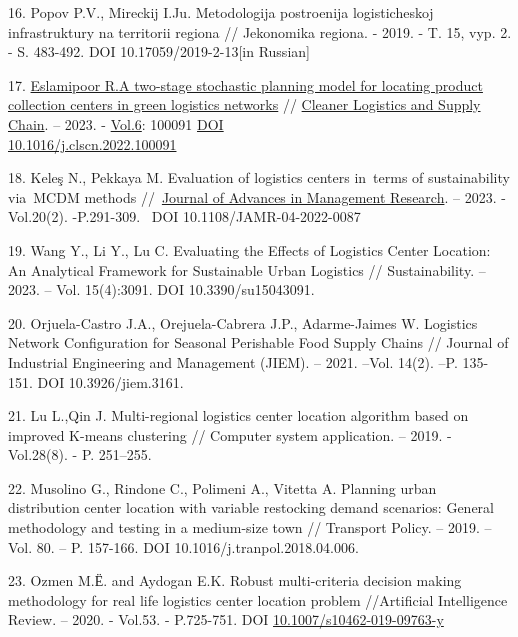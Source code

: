 \begin{references}
16. Popov P.V., Mireckij I.Ju. Metodologija postroenija logisticheskoj
infrastruktury na territorii regiona // Jekonomika regiona. - 2019. -
T. 15, vyp. 2. - S. 483-492. DOI 10.17059/2019-2-13{[}in Russian{]}

17. \href{https://www.scopus.com/authid/detail.uri?origin=resultslist&authorId=55624611200&zone=}{Eslamipoor
R.}\href{https://www.scopus.com/record/display.uri?eid=2-s2.0-85146138004&origin=resultslist&sort=plf-f&src=s&st1=logistics+center&sid=608c0e84c46c21631ea70ffcaa21b2a6&sot=b&sdt=b&sl=23&s=TITLE\%28logistics+center\%29&relpos=0&citeCnt=0&searchTerm=}{A
two-stage stochastic planning model for locating product collection
centers in green logistics networks} //
\href{https://www.scopus.com/sourceid/21101098869?origin=resultslist}{Cleaner
Logistics and Supply Chain}. -- 2023. -
\href{https://www.sciencedirect.com/journal/cleaner-logistics-and-supply-chain/vol/6/suppl/C}{Vol.6}:
100091 \href{https://doi.org/10.1016/j.clscn.2022.100091}{DOI\\
10.1016/j.clscn.2022.100091}

18. Keleş N., Pekkaya M. Evaluation of logistics centers in~terms of
sustainability via~MCDM methods
//~\href{https://www.emerald.com/insight/publication/issn/0972-7981}{Journal
of Advances in Management Research}. -- 2023. - Vol.20(2).
-P.291-309.~ DOI 10.1108/JAMR-04-2022-0087

19. Wang Y., Li Y., Lu C. Evaluating the Effects of Logistics Center
Location: An Analytical Framework for Sustainable Urban Logistics //
Sustainability. -- 2023. -- Vol. 15(4):3091. DOI 10.3390/su15043091.

20. Orjuela-Castro J.A., Orejuela-Cabrera J.P., Adarme-Jaimes W. Logistics
Network Configuration for Seasonal Perishable Food Supply Chains //
Journal of Industrial Engineering and Management (JIEM). -- 2021.
--Vol. 14(2). --P. 135-151. DOI 10.3926/jiem.3161.

21. Lu L.,Qin J. Multi-regional logistics center location algorithm based
on improved K-means clustering // Computer system application. --
2019. - Vol.28(8). - P. 251--255.

22. Musolino G., Rindone C., Polimeni A., Vitetta A. Planning urban
distribution center location with variable restocking demand
scenarios: General methodology and testing in a medium-size town //
Transport Policy. -- 2019. --Vol. 80. -- P. 157-166. DOI
10.1016/j.tranpol.2018.04.006.

23. Ozmen M.Ё. and Aydogan E.K. Robust multi-criteria decision making
methodology for real life logistics center location problem
//Artificial Intelligence Review. -- 2020. - Vol.53. - P.725-751. DOI
\href{https://link.springer.com/article/10.1007/s10462-019-09763-y}{10.1007/s10462-019-09763-y}


\end{references}
